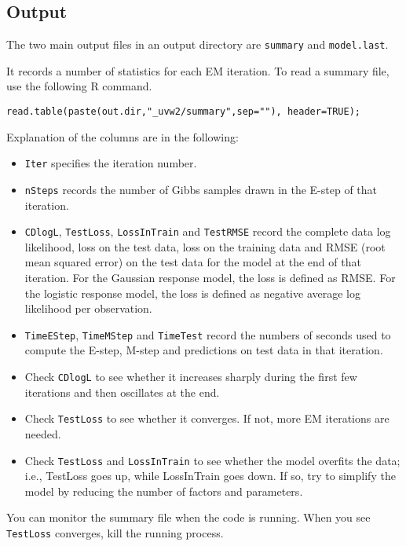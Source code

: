 \documentclass[10pt]{article}
\newcommand{\parahead}[1]{\vspace{0.15in}\noindent{\bf #1:}}
\begin{document}
\subsection{Output}
\label{sec:model-output}

The two main output files in an output directory are {\tt summary} and {\tt model.last}.

\parahead{Summary File}
It records a number of statistics for each EM iteration.  To read a summary file, use the following R command.
{\small\begin{verbatim}
read.table(paste(out.dir,"_uvw2/summary",sep=""), header=TRUE);
\end{verbatim}}
\noindent Explanation of the columns are in the following:
\begin{itemize}
\item {\tt Iter} specifies the iteration number.
\item {\tt nSteps} records the number of Gibbs samples drawn in the E-step of that iteration.
\item {\tt CDlogL}, {\tt TestLoss}, {\tt LossInTrain} and {\tt TestRMSE} record the complete data log likelihood, loss on the test data, loss on the training data and RMSE (root mean squared error) on the test data for the model at the end of that iteration.  For the Gaussian response model, the loss is defined as RMSE.  For the logistic response model, the loss is defined as negative average log likelihood per observation.
\item {\tt TimeEStep}, {\tt TimeMStep} and {\tt TimeTest} record the numbers of seconds used to compute the E-step, M-step and predictions on test data in that iteration.
\end{itemize}

\parahead{Sanity Check}
\begin{itemize}
\item Check {\tt CDlogL} to see whether it increases sharply during the first few iterations and then oscillates at the end.
\item Check {\tt TestLoss} to see whether it converges.  If not, more EM iterations are needed.
\item Check {\tt TestLoss} and {\tt LossInTrain} to see whether the model overfits the data; i.e., TestLoss goes up, while LossInTrain goes down.  If so, try to simplify the model by reducing the number of factors and parameters.
\end{itemize}
You can monitor the summary file when the code is running.  When you see {\tt TestLoss} converges, kill the running process.
\end{document}
